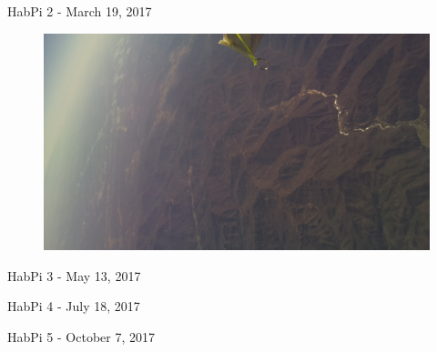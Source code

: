 \documentclass{beamer}
\begin{document}
\begin{frame}{HabPi 2 - March 19, 2017}
    \begin{figure}
        \centering
        \includegraphics[width=\textwidth]{images/habpi2_4}
    \end{figure}
\end{frame}

\begin{frame}{HabPi 3 - May 13, 2017}
\end{frame}

\begin{frame}{HabPi 4 - July 18, 2017}
\end{frame}

\begin{frame}{HabPi 5 - October 7, 2017}
\end{frame}
\end{document}
